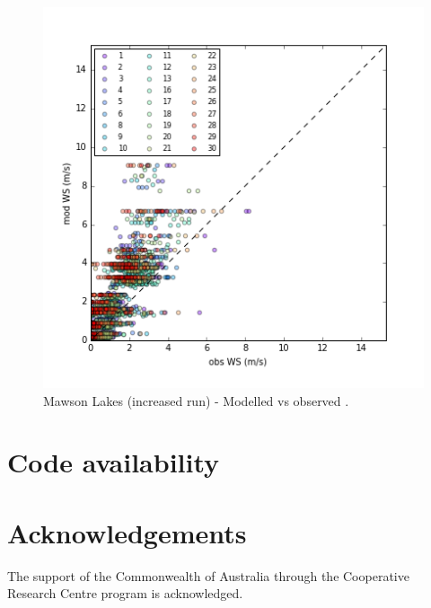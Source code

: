 \documentclass[final,3p,times,authoryear]{elsarticle}
\begin{document}
\begin{figure}[!htbp]
\includegraphics[trim=0mm 0mm 0mm 0mm, clip,scale=1.0]{images/MawsonUcan.png}
 \caption{Mawson Lakes (increased  run) - Modelled  vs observed .} \label{fig:MawsonUcan}
\end{figure}


































\section{Code availability}\label{sec:available}

\printglossary[title={List of Symbols}]

\section*{Acknowledgements}
The support of the Commonwealth of Australia through the Cooperative Research Centre program is acknowledged.
\end{document}
